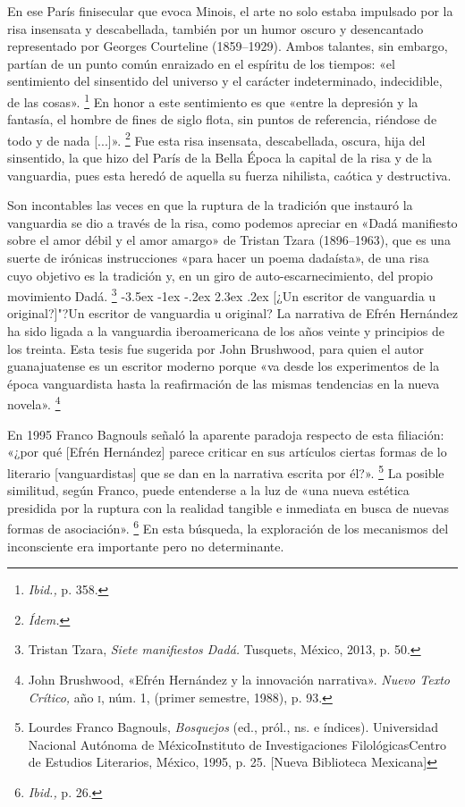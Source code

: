 \documentclass[14pt,twoside,final]{extbook} %
\makeatletter
\let\oldfootnote\footnote
\renewcommand\footnote[1]{%
\oldfootnote{\hspace{1mm}#1}}
\renewcommand\section{\@startsection {section}{1}{\z@}%
                                     {-3.5ex \@plus -1ex \@minus -.2ex}%
                                     {2.3ex \@plus .2ex}%
                                     {\normalfont\large\bfseries\sc}}
\makeatother
\begin{document}
En ese París finisecular que evoca Minois, el arte no solo estaba impulsado por la risa insensata y descabellada, también por un humor oscuro y desencantado representado por Georges Courteline (1859--1929). Ambos talantes, sin embargo, partían de un punto común enraizado en el espíritu de los tiempos: «el sentimiento del sinsentido del universo y el carácter indeterminado, indecidible, de las cosas».\footnote{\emph{Ibid.,} p. 358.} En honor a este sentimiento es que «entre la depresión y la fantasía, el hombre de fines de siglo flota, sin puntos de referencia, riéndose de todo y de nada [...]».\footnote{\em Ídem.} Fue esta risa insensata, descabellada, oscura, hija del sinsentido, la que hizo del París de la Bella Época la capital de la risa y de la vanguardia, pues esta heredó de aquella su fuerza nihilista, caótica y destructiva.

Son incontables las veces en que la ruptura de la tradición que instauró la vanguardia se dio a través de la risa, como podemos apreciar en «Dadá manifiesto sobre el amor débil y el amor amargo» de Tristan Tzara (\mbox{1896--1963}), que es una suerte de irónicas instrucciones «para hacer un poema dadaísta», de una risa cuyo objetivo es la tradición y, en un giro de auto-escarnecimiento, del propio movimiento Dadá.\footnote{Tristan Tzara, \emph{Siete manifiestos Dadá.} Tusquets, México, 2013, p. 50.}
\section[¿Un escritor de vanguardia u original?]{"?Un escritor de vanguardia u original?}\label{sec:un-escritor-de-vanguardia-u-original}
La narrativa de Efrén Hernández ha sido ligada a la vanguardia iberoamericana de los años veinte y principios de los treinta. Esta tesis fue sugerida por John Brushwood, para quien el autor guanajuatense es un escritor moderno porque «va desde los experimentos de la época vanguardista hasta la reafirmación de las mismas tendencias en la nueva novela».\footnote{John Brushwood, «Efrén Hernández y la innovación narrativa». \emph{Nuevo Texto Crítico,} año \textsc{i}, núm. 1, (primer semestre, 1988), p. 93.}\protect\enlargethispage*{\baselineskip}

En 1995 Franco Bagnouls señaló la aparente paradoja respecto de esta filiación: «¿por qué [Efrén Hernández] parece criticar en sus artículos ciertas formas de lo literario [vanguardistas] que se dan en la narrativa escrita por él?».\footnote{Lourdes Franco Bagnouls, \emph{Bosquejos} (ed., pról., ns. e índices). Universidad Nacional Autónoma de México\kernedslash Instituto de Investigaciones Filológicas\kernedslash Centro de Estudios Literarios, México, 1995, p. 25. [Nueva Biblioteca Mexicana]} La posible similitud, según Franco, puede entenderse a la luz de «una nueva estética presidida por la ruptura con la realidad tangible e inmediata en busca de nuevas formas de asociación».\footnote{\emph{Ibid.,} p. 26.} En esta búsqueda, la exploración de los mecanismos del inconsciente era importante pero no determinante.
\end{document}
